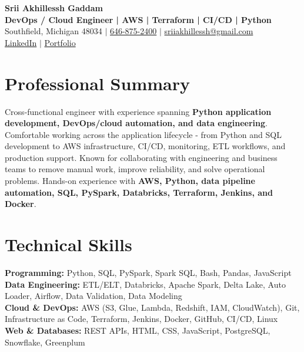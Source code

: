 \documentclass[letterpaper,10pt]{article}
\begin{document}
\fontsize{9.35pt}{10.45pt}\selectfont

\begin{center}
    {\LARGE \textbf{Srii Akhillessh Gaddam}} \\[-1pt]
    \textbf{DevOps / Cloud Engineer | AWS | Terraform | CI/CD | Python} \\[2pt]
    Southfield, Michigan 48034 $|$
    \href{tel:6468752400}{646-875-2400} $|$
    \href{mailto:sriiakhillessh@gmail.com}{sriiakhillessh@gmail.com} \\[1pt]
    \href{https://www.linkedin.com/in/srii-akhiilessh-gaddam-b48668191/}{LinkedIn} $|$
    \href{https://sriiakhillesshg.github.io/portfolio/}{Portfolio}
\end{center}
\vspace{-8pt}

\section{Professional Summary}
\small{Cross-functional engineer with experience spanning \textbf{Python application development, DevOps/cloud automation, and data engineering}. Comfortable working across the application lifecycle - from Python and SQL development to AWS infrastructure, CI/CD, monitoring, ETL workflows, and production support. Known for collaborating with engineering and business teams to remove manual work, improve reliability, and solve operational problems. Hands-on experience with \textbf{AWS, Python, data pipeline automation, SQL, PySpark, Databricks, Terraform, Jenkins, and Docker}.}

\section{Technical Skills}
\small{
\textbf{Programming:} Python, SQL, PySpark, Spark SQL, Bash, Pandas, JavaScript \\
\textbf{Data Engineering:} ETL/ELT, Databricks, Apache Spark, Delta Lake, Auto Loader, Airflow, Data Validation, Data Modeling \\
\textbf{Cloud \& DevOps:} AWS (S3, Glue, Lambda, Redshift, IAM, CloudWatch), Git, Infrastructure as Code, Terraform, Jenkins, Docker, GitHub, CI/CD, Linux \\
\textbf{Web \& Databases:} REST APIs, HTML, CSS, JavaScript, PostgreSQL, Snowflake, Greenplum
}
\end{document}
